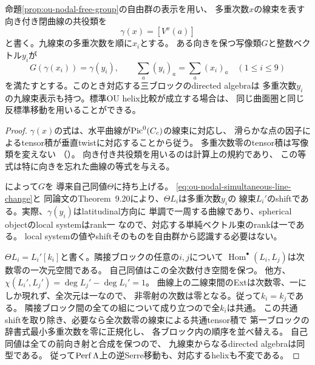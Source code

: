 \begin{lemma}[九線束の同時変換の判定]
\label{lem:ou-nodal-simultaneous-line-change}
命題\ref{prop:ou-nodal-free-group}の自由群の表示を用い、
多重次数$x$の線束を表す向き付き閉曲線の共役類を
\[
 \gamma(x)=[V^x(a)]
\]
と書く。九線束の多重次数を順に$x_i$とする。
ある向きを保つ写像類$G$と整数ベクトル$y_i$が
\begin{equation}\label{eq:ou-nodal-simultaneous-line-change}
 G(\gamma(x_i))=\gamma(y_i),\qquad \sum_a(y_i)_a=\sum_a(x_i)_a
 \quad(1\leq i\leq9)
\end{equation}
を満たすとする。このとき対応する三ブロックのdirected algebraは
多重次数$y_i$の九線束表示も持つ。標準OU helix比較が成立する場合は、
同じ曲面圏と同じ反標準移動を用いることができる。
\end{lemma}
\begin{proof}
$\gamma(x)$の式は、水平曲線が$\operatorname{Pic}^0(C_c)$の線束に対応し、
滑らかな点の因子によるtensor積が垂直twistに対応することから従う。
多重次数零のtensor積は写像類を変えない
（\cite[Example~4.7, Proposition~6.11, Proposition~8.40,
Theorem~9.20]{Opper2026}）。
向き付き共役類を用いるのは計算上の規約であり、
この等式は特に向きを忘れた曲線の等式を与える。

\cite[Corollary~8.41]{Opper2026}によって$G$を
導来自己同値$\Theta$に持ち上げる。
\eqref{eq:ou-nodal-simultaneous-line-change}と
同論文のTheorem~9.20により、$\Theta L_i$は多重次数$y_i$の
線束$L_i'$のshiftである。実際、$\gamma(y_i)$はlatitudinal方向に
単調で一周する曲線であり、spherical objectのlocal systemはrank一
なので、対応する単純ベクトル束のrankは一である。
local systemの値やshiftそのものを自由群から認識する必要はない。

$\Theta L_i=L_i'[k_i]$と書く。隣接ブロックの任意の$i,j$について
$\operatorname{Hom}^{\bullet}(L_i,L_j)$は次数零の一次元空間である。
自己同値はこの全次数付き空間を保つ。
他方、$\chi(L_i',L_j')=\deg L_j'-\deg L_i'=1$。
曲線上の二線束間のExtは次数零、一にしか現れず、全次元は一なので、
非零射の次数は零となる。従って$k_i=k_j$である。
隣接ブロック間の全ての組について成り立つので全$k_i$は共通。
この共通shiftを取り除き、必要なら全次数零の線束による共通tensor積で
第一ブロックの辞書式最小多重次数を零に正規化し、
各ブロック内の順序を並べ替える。
自己同値は全ての前向き射と合成を保つので、
九線束からなるdirected algebraは同型である。
従って$\operatorname{Perf}\Lambda$上の逆Serre移動も、対応するhelixも不変である。
\end{proof}

